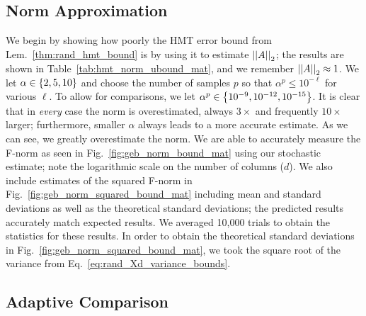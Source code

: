 

\subsection{Norm Approximation}

We begin by showing how poorly the HMT error bound from
Lem.~\ref{thm:rand_hmt_bound} is by using it to estimate
$\left| \left| A \right| \right|_{2}$; the results are shown
in Table~\ref{tab:hmt_norm_ubound_mat}, and we remember $\left| \left| A \right| \right|_{2}\approx1$.
We let $\alpha\in\left\{ 2,5,10 \right\}$ and choose the number of samples
$p$ so that $\alpha^{p}\le 10^{-\ell}$ for various $\ell$.
To allow for comparisons, we let
$\alpha^{p}\in\left\{ 10^{-9},10^{-12},10^{-15} \right\}$.
It is clear that in \emph{every} case the norm is overestimated, always
$3\times$ and frequently $10\times$ larger; furthermore, smaller $\alpha$
always leads to a more accurate estimate.
As we can see, we greatly overestimate the norm.
We are able to accurately measure the F-norm as seen
in Fig.~\ref{fig:geb_norm_bound_mat} using our stochastic estimate;
note the logarithmic scale on the number of columns ($d$).
We also include estimates of the squared F-norm in
Fig.~\ref{fig:geb_norm_squared_bound_mat} including mean and standard
deviations as well as the theoretical standard deviations;
the predicted results accurately match expected results.
We averaged 10,000 trials to obtain the statistics for these results.
In order to obtain the theoretical standard deviations in
Fig.~\ref{fig:geb_norm_squared_bound_mat}, we took the square root
of the variance from Eq.~\eqref{eq:rand_Xd_variance_bounds}.






\subsection{Adaptive Comparison}

